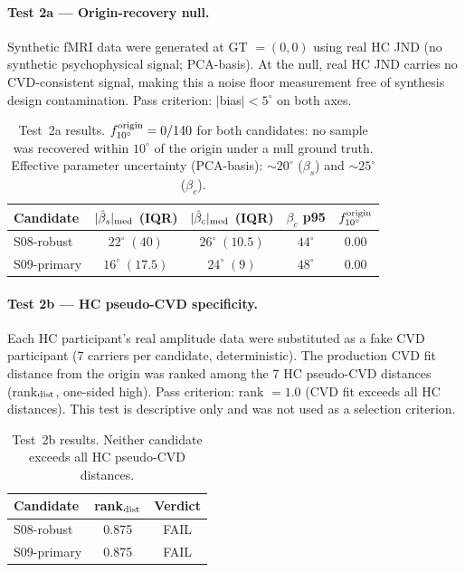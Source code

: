 \paragraph{Test 2a — Origin-recovery null.}

Synthetic fMRI data were generated at GT $= (0, 0)$ using real HC
JND (no synthetic psychophysical signal; PCA-basis).
At the null, real HC JND carries no CVD-consistent signal, making
this a noise floor measurement free of synthesis design
contamination.
Pass criterion: $|$bias$| < 5^\circ$ on both axes.

\begin{table}[h]
\centering
\begin{tabular}{lcccc}
\hline
Candidate
  & $|\hat\beta_s|_{\rm med}$ (IQR)
  & $|\hat\beta_c|_{\rm med}$ (IQR)
  & $\beta_c$ p95
  & $f_{10^\circ}^{\rm origin}$ \\
\hline
S08-robust  & $22^\circ\;(40)$ & $26^\circ\;(10.5)$ & $44^\circ$ & 0.00 \\
S09-primary & $16^\circ\;(17.5)$ & $24^\circ\;(9)$  & $48^\circ$ & 0.00 \\
\hline
\end{tabular}
\caption{Test~2a results. $f_{10^\circ}^{\rm origin} = 0/140$ for
both candidates: no sample was recovered within $10^\circ$ of the
origin under a null ground truth.
Effective parameter uncertainty (PCA-basis): $\sim\!20^\circ$ ($\beta_s$)
and $\sim\!25^\circ$ ($\beta_c$).}
\end{table}

\paragraph{Test 2b — HC pseudo-CVD specificity.}

Each HC participant's real amplitude data were substituted as a
fake CVD participant (7 carriers per candidate, deterministic).
The production CVD fit distance from the origin was ranked among
the 7 HC pseudo-CVD distances (rank$_{\rm dist}$, one-sided high).
Pass criterion: rank $= 1.0$ (CVD fit exceeds all HC distances).
This test is descriptive only and was not used as a selection
criterion.

\begin{table}[h]
\centering
\begin{tabular}{lcc}
\hline
Candidate & rank$_{\rm dist}$ & Verdict \\
\hline
S08-robust  & 0.875 & FAIL \\
S09-primary & 0.875 & FAIL \\
\hline
\end{tabular}
\caption{Test~2b results. Neither candidate exceeds all HC
pseudo-CVD distances.}
\end{table}

